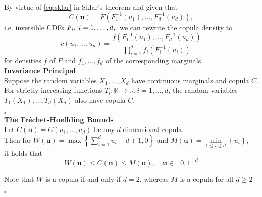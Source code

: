 By virtue of \autoref{eq:sklar} in Sklar's theorem and given that
\begin{equation} 
C(\mathbf{u})=F\left(F_{1}^{-1}\left(u_{1}\right), \ldots, F_{d}^{-1}\left(u_{d}\right)\right) ,
\label{eq:sklar_inverse}
\end{equation}
i.e. inversible \ac{CDF}s $ F_i, \hspace{0.25em} i = 1, \ldots, d, \hspace{0.25em}$ we can rewrite the copula density to
\begin{equation}
c\left(u_{1}, \ldots, u_{d}\right)=\frac{f\left(F_{1}^{-1}\left(u_{1}\right), \ldots, F_{d}^{-1}\left(u_{d}\right)\right)}{\prod \limits _{i=1}^{d} f_{i}\left(F_{i}^{-1}\left(u_{i}\right)\right)}
\label{eq:copula_density_2}
\end{equation}
for densities $f$ of $F$ and $f_1, \ldots, f_d$ of the corresponding marginals.\\


\textbf{Invariance Principal}\\
Suppose the random variables $ X_1, \ldots, X_d $  have continuous marginals and copula $C$. For strictly increasing functions $T_i : \mathbb{R} \rightarrow \mathbb{R}, i = 1, \ldots, d$, the random variables $T_1(X_1), \ldots, T_d(X_d)$ also have copula $C$.

\hfill $\square$ \\


\textbf{The Fr\'echet-Hoeffding Bounds}\\
Let $C(\bm{u}) = C(u_1, \ldots, u_d)$ be any $d$-dimensional copula.\\
Then for
$W(\boldsymbol{u})=\max \left\{\sum\limits_{i=1}^{d} u_{i}-d+1, 0\right\}$
and
$M(\boldsymbol{u})=\min \limits _{1 \leq i \leq d}\left\{u_{i}\right\}$,\\
it holds that
\begin{equation}
W(\bm{u}) \leq C(\bm{u}) \leq M(\bm{u}), \quad \bm{u} \in[0,1]^{d}
\end{equation}

Note that $W$ is a copula if and only if $d=2$, whereas $M$ is a copula for all $d \geq 2$ 

\hfill $\square$ \\



